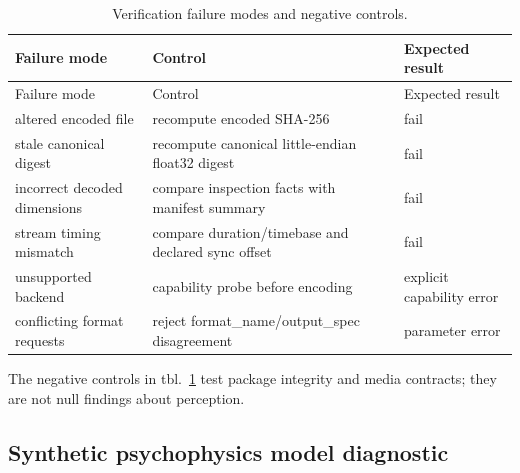\documentclass[
  english,
]{article}
\begin{document}
\begin{longtable}[]{@{}
  >{\raggedright\arraybackslash}p{}
  >{\raggedright\arraybackslash}p{}
  >{\raggedright\arraybackslash}p{}@{}}
\caption{Verification failure modes and negative
controls.}\label{tbl:verification}\tabularnewline
\toprule\noalign{}
\begin{minipage}[b]{\linewidth}\raggedright
Failure mode
\end{minipage} & \begin{minipage}[b]{\linewidth}\raggedright
Control
\end{minipage} & \begin{minipage}[b]{\linewidth}\raggedright
Expected result
\end{minipage} \\
\midrule\noalign{}
\endfirsthead
\toprule\noalign{}
\begin{minipage}[b]{\linewidth}\raggedright
Failure mode
\end{minipage} & \begin{minipage}[b]{\linewidth}\raggedright
Control
\end{minipage} & \begin{minipage}[b]{\linewidth}\raggedright
Expected result
\end{minipage} \\
\midrule\noalign{}
\endhead
\bottomrule\noalign{}
\endlastfoot
altered encoded file & recompute encoded SHA-256 & fail \\
stale canonical digest & recompute canonical little-endian float32
digest & fail \\
incorrect decoded dimensions & compare inspection facts with manifest
summary & fail \\
stream timing mismatch & compare duration/timebase and declared sync
offset & fail \\
unsupported backend & capability probe before encoding & explicit
capability error \\
conflicting format requests & reject format\_name/output\_spec
disagreement & parameter error \\
\end{longtable}

The negative controls in tbl.~\ref{tbl:verification} test package
integrity and media contracts; they are not null findings about
perception.

\subsection{Synthetic psychophysics model
diagnostic}\label{synthetic-psychophysics-model-diagnostic}
\end{document}
